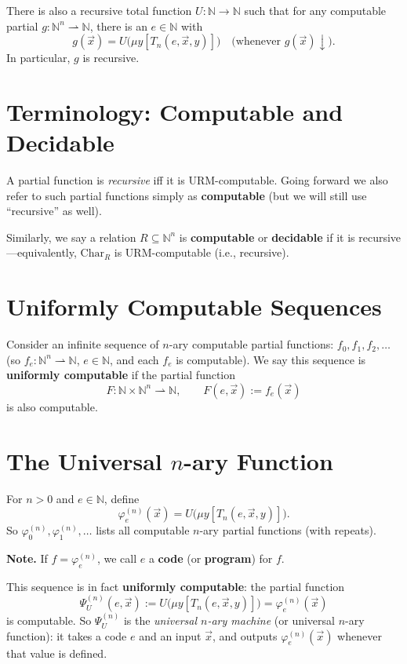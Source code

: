 \documentclass[11pt]{article}
\begin{document}
There is also a recursive total function $U\colon \mathbb{N} \to \mathbb{N}$ such that for any computable partial $g\colon \mathbb{N}^n \rightharpoonup \mathbb{N}$, there is an $e \in \mathbb{N}$ with
\[
    g(\vec{x}) = U\bigl(\mu y[T_n(e, \vec{x}, y)]\bigr) \quad \text{(whenever } g(\vec{x}){\downarrow}\text{)}.
\]
In particular, $g$ is recursive.

\section{Terminology: Computable and Decidable}

A partial function is \emph{recursive} iff it is URM-computable. Going forward we also refer to such partial functions simply as \textbf{computable} (but we will still use ``recursive'' as well).

Similarly, we say a relation $R \subseteq \mathbb{N}^n$ is \textbf{computable} or \textbf{decidable} if it is recursive---equivalently, $\mathrm{Char}_R$ is URM-computable (i.e., recursive).

\section{Uniformly Computable Sequences}

Consider an infinite sequence of $n$-ary computable partial functions: $f_0, f_1, f_2, \dots$ (so $f_e\colon \mathbb{N}^n \rightharpoonup \mathbb{N}$, $e \in \mathbb{N}$, and each $f_e$ is computable). We say this sequence is \textbf{uniformly computable} if the partial function
\[
    F\colon \mathbb{N} \times \mathbb{N}^n \rightharpoonup \mathbb{N}, \qquad F(e, \vec{x}) := f_e(\vec{x})
\]
is also computable.

\section{The Universal $n$-ary Function}

For $n > 0$ and $e \in \mathbb{N}$, define
\[
    \varphi_e^{(n)}(\vec{x}) = U\bigl(\mu y[T_n(e, \vec{x}, y)]\bigr).
\]
So $\varphi_0^{(n)}, \varphi_1^{(n)}, \dots$ lists all computable $n$-ary partial functions (with repeats).

\textbf{Note.} If $f = \varphi_e^{(n)}$, we call $e$ a \textbf{code} (or \textbf{program}) for $f$.

This sequence is in fact \textbf{uniformly computable}: the partial function
\[
    \Psi_U^{(n)}(e, \vec{x}) := U\bigl(\mu y[T_n(e, \vec{x}, y)]\bigr) = \varphi_e^{(n)}(\vec{x})
\]
is computable.
So $\Psi_U^{(n)}$ is the \emph{universal $n$-ary machine} (or universal $n$-ary function): it takes a code $e$ and an input $\vec{x}$, and outputs $\varphi_e^{(n)}(\vec{x})$ whenever that value is defined.
\end{document}
